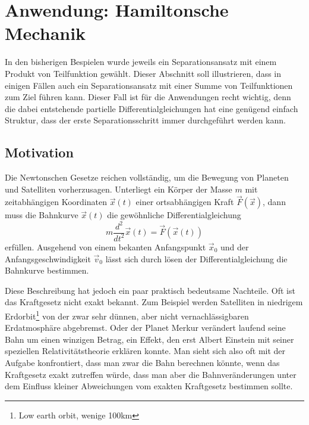 %
%
%
\section{Anwendung: Hamiltonsche Mechanik\label{hamilton-mechanik}}
In den bisherigen Bespielen wurde jeweils ein Separationsansatz mit
einem Produkt von Teilfunktion gewählt.
Dieser Abschnitt soll illustrieren, dass in einigen Fällen auch
ein Separationsansatz mit einer Summe von Teilfunktionen
zum Ziel führen kann.
Dieser Fall ist für die Anwendungen recht wichtig, denn die
dabei entstehende partielle Differentialgleichungen hat eine
genügend einfach Struktur, dass der erste Separationsschritt immer
durchgeführt werden kann.

\subsection{Motivation}
Die Newtonschen Gesetze reichen vollständig, um die Bewegung von
Planeten und Satelliten vorherzusagen.
Unterliegt
ein Körper der Masse $m$ mit zeitabhängigen Koordinaten $\vec x(t)$
einer ortsabhängigen Kraft $\vec F(\vec x)$, dann muss die Bahnkurve 
$\vec x(t)$ die gewöhnliche Differentialgleichung
\begin{equation}
m\frac{d^2}{dt^2}\vec x(t)=\vec F(\vec x(t))
\label{jacobi:newton}
\end{equation}
erfüllen. Ausgehend von einem bekanten Anfangspunkt $\vec x_0$ und
der Anfangsgeschwindigkeit $\vec v_0$ lässt sich durch
lösen der Differentialgleichung die Bahnkurve bestimmen.

Diese Beschreibung hat jedoch ein paar praktisch bedeutsame Nachteile.
Oft ist das Kraftgesetz nicht exakt bekannt. Zum Beispiel werden
Satelliten in niedrigem Erdorbit\footnote{Low earth orbit, wenige 100km}
von der zwar sehr dünnen, aber nicht vernachlässigbaren
Erdatmosphäre abgebremst.
Oder der Planet Merkur verändert laufend seine Bahn um einen winzigen
Betrag, ein Effekt, den erst Albert Einstein mit seiner speziellen
Relativitätstheorie erklären konnte.
Man sieht sich also oft mit der Aufgabe konfrontiert, dass man zwar die
Bahn berechnen könnte, wenn das Kraftgesetz exakt zutreffen würde,
dass man aber die Bahnveränderungen unter dem Einfluss kleiner
Abweichungen vom exakten Kraftgesetz bestimmen sollte.

